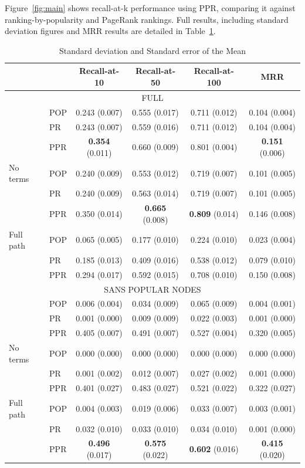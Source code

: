 \documentclass[11pt,oneside]{book}
\begin{document}
Figure~\ref{fig:main} shows recall-at-k performance using PPR, comparing it against ranking-by-popularity and PageRank rankings. Full results, including standard deviation figures and MRR results are detailed in Table~\ref{tab:full}. 
\begin{table}[p]
\centering
\caption{Standard deviation and Standard error of the Mean}
\label{tab:full}
\begin{tabular}{llcccc} \hline
	& & Recall-at-10 & Recall-at-50 & Recall-at-100 & MRR	 \\
\hline
\multicolumn{6}{c}{FULL} \\
\hline
& POP & 0.243 (0.007) & 0.555 (0.017) & 0.711 (0.012) & 0.104 (0.004) \\
& PR & 	0.243 (0.007) & 0.559 (0.016) & 0.711 (0.012) & 0.104 (0.004) \\
& PPR	& \textbf{0.354}	(0.011) & 0.660	(0.009) & 0.801 (0.004) & \textbf{0.151}	(0.006) \\
\hline
No terms & POP & 0.240 (0.009) & 0.553 (0.012) & 0.719 (0.007) & 0.101 (0.005) \\
& PR & 0.240 (0.009) & 0.563 (0.014) & 0.719 (0.007) & 0.101 (0.005) \\
& PPR	& 0.350	(0.014) & \textbf{0.665}	(0.008) & \textbf{0.809}	(0.014) & 0.146	(0.008) \\
\hline
Full path & POP & 0.065 (0.005) & 0.177 (0.010) & 0.224 (0.010) & 0.023 (0.004) \\
& PR & 0.185 (0.013) & 0.409 (0.016) & 0.538 (0.012) & 0.079 (0.010) \\
& PPR	& 0.294	(0.017) & 0.592	(0.015) & 0.708	(0.010) & 0.150	(0.008) \\
\hline
\multicolumn{6}{c}{SANS POPULAR NODES} \\
\hline
 & POP & 	0.006 (0.004) & 0.034 (0.009) & 0.065 (0.009) & 0.004 (0.001) \\
 & PR	& 0.001	(0.000) & 0.009	(0.009) & 0.022	(0.003) & 0.001	(0.000) \\
& PPR	& 0.405	(0.007) & 0.491 (0.007) & 0.527	(0.004) & 0.320	(0.005) \\
\hline
No terms & POP & 	0.000 (0.000) & 0.000 (0.000) & 0.000 (0.000) & 0.000 (0.000) \\
& PR & 	0.001 (0.002) & 0.012 (0.007) & 0.027 (0.002) & 0.001 (0.000) \\
& PPR & 	0.401 (0.027) & 0.483 (0.027) & 0.521 (0.022) & 0.322 (0.027) \\
\hline
Full path & POP & 	0.004 (0.003) & 0.019 (0.006) & 0.033 (0.007) & 0.003 (0.001) \\
& PR & 	0.032 (0.010) & 0.033 (0.010) & 0.034 (0.010) & 0.001 (0.000) \\
& PPR	& \textbf{0.496}	(0.017) & \textbf{0.575}	(0.022) & \textbf{0.602}	(0.016) & \textbf{0.415}	(0.020) \\
\hline
\end{tabular}
\end{table}
\end{document}
